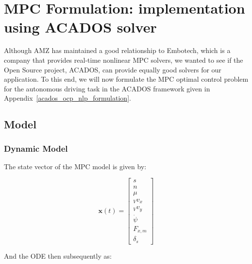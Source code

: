 \documentclass[
a4paper, %
10pt, %
notitlepage,
english]{CSUniSchoolLabReport}
\begin{document}
\chapter{MPC Formulation: implementation using ACADOS solver}

Although AMZ has maintained a good relationship to Embotech, which is a company that provides real-time nonlinear MPC solvers, we wanted to see if the Open Source project, ACADOS, can provide equally good solvers for our application. To this end, we will now formulate the MPC optimal control problem for the autonomous driving task in the ACADOS framework given in Appendix~\ref{acados_ocp_nlp_formulation}.

\section{Model}

\subsection{Dynamic Model}

The state vector of the MPC model is given by:

\begin{equation}
	\mathbf{x}(t) =
	\left[\begin{array}{c}

		s \\

		n \\

		\mu \\

		{}_Vv_x \\

		{}_Vv_y \\

		\dot{\psi}\;\;\; \\

		F_{x,m} \\

		\delta_s

	\end{array}\right]
\end{equation}

And the ODE then subsequently as:
\end{document}
